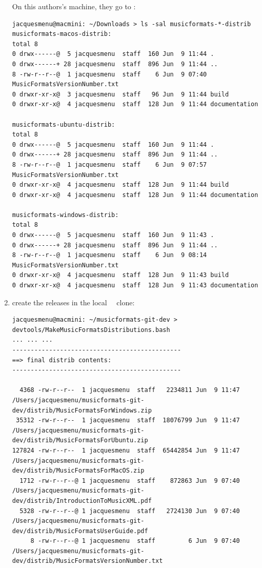 \begin{enumerate}
On this authors's machine, they go to :
\begin{lstlisting}[language=Terminal]
jacquesmenu@macmini: ~/Downloads > ls -sal musicformats-*-distrib
musicformats-macos-distrib:
total 8
0 drwx------@  5 jacquesmenu  staff  160 Jun  9 11:44 .
0 drwx------+ 28 jacquesmenu  staff  896 Jun  9 11:44 ..
8 -rw-r--r--@  1 jacquesmenu  staff    6 Jun  9 07:40 MusicFormatsVersionNumber.txt
0 drwxr-xr-x@  3 jacquesmenu  staff   96 Jun  9 11:44 build
0 drwxr-xr-x@  4 jacquesmenu  staff  128 Jun  9 11:44 documentation

musicformats-ubuntu-distrib:
total 8
0 drwx------@  5 jacquesmenu  staff  160 Jun  9 11:44 .
0 drwx------+ 28 jacquesmenu  staff  896 Jun  9 11:44 ..
8 -rw-r--r--@  1 jacquesmenu  staff    6 Jun  9 07:57 MusicFormatsVersionNumber.txt
0 drwxr-xr-x@  4 jacquesmenu  staff  128 Jun  9 11:44 build
0 drwxr-xr-x@  4 jacquesmenu  staff  128 Jun  9 11:44 documentation

musicformats-windows-distrib:
total 8
0 drwx------@  5 jacquesmenu  staff  160 Jun  9 11:43 .
0 drwx------+ 28 jacquesmenu  staff  896 Jun  9 11:44 ..
8 -rw-r--r--@  1 jacquesmenu  staff    6 Jun  9 08:14 MusicFormatsVersionNumber.txt
0 drwxr-xr-x@  4 jacquesmenu  staff  128 Jun  9 11:43 build
0 drwxr-xr-x@  4 jacquesmenu  staff  128 Jun  9 11:43 documentation
\end{lstlisting}


\item create the releases in the local \mf\ \repo\ clone:
\begin{lstlisting}[language=TerminalSmall]
jacquesmenu@macmini: ~/musicformats-git-dev > devtools/MakeMusicFormatsDistributions.bash
... ... ...
----------------------------------------------
==> final distrib contents:
----------------------------------------------

  4368 -rw-r--r--  1 jacquesmenu  staff   2234811 Jun  9 11:47 /Users/jacquesmenu/musicformats-git-dev/distrib/MusicFormatsForWindows.zip
 35312 -rw-r--r--  1 jacquesmenu  staff  18076799 Jun  9 11:47 /Users/jacquesmenu/musicformats-git-dev/distrib/MusicFormatsForUbuntu.zip
127824 -rw-r--r--  1 jacquesmenu  staff  65442854 Jun  9 11:47 /Users/jacquesmenu/musicformats-git-dev/distrib/MusicFormatsForMacOS.zip
  1712 -rw-r--r--@ 1 jacquesmenu  staff    872863 Jun  9 07:40 /Users/jacquesmenu/musicformats-git-dev/distrib/IntroductionToMusicXML.pdf
  5328 -rw-r--r--@ 1 jacquesmenu  staff   2724130 Jun  9 07:40 /Users/jacquesmenu/musicformats-git-dev/distrib/MusicFormatsUserGuide.pdf
     8 -rw-r--r--@ 1 jacquesmenu  staff         6 Jun  9 07:40 /Users/jacquesmenu/musicformats-git-dev/distrib/MusicFormatsVersionNumber.txt


\end{lstlisting}
\end{enumerate}
